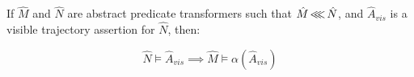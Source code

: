 \begin{theorem}
\label{thm:refinement}
If $\hat M$ and $\hat N$ are abstract predicate transformers such that $\hat M \operatorname{\lll} \hat N$, and $\hat A_{vis}$ is a visible trajectory assertion for $\hat N$, then:

\begin{equation*}
\hat N \models \hat A_{vis} \implies \hat M \models \alpha(\hat A_{vis})
\end{equation*}
\end{theorem}

